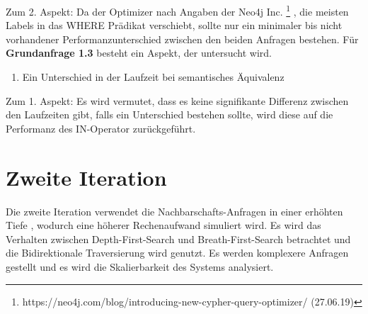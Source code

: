 Zum 2. Aspekt: Da der Optimizer nach Angaben der Neo4j Inc. \footnote{https://neo4j.com/blog/introducing-new-cypher-query-optimizer/ (27.06.19)} , die meisten Labels in das WHERE Prädikat verschiebt, sollte nur ein minimaler bis nicht vorhandener Performanzunterschied zwischen den beiden Anfragen bestehen. \newline \newline
Für \textbf{Grundanfrage 1.3} besteht ein Aspekt, der untersucht wird. 
\begin{enumerate}
	\item Ein Unterschied in der Laufzeit bei  semantisches Äquivalenz  
\end{enumerate}
Zum 1. Aspekt: Es wird vermutet, dass es keine signifikante Differenz zwischen den Laufzeiten gibt, falls ein Unterschied bestehen sollte, wird diese auf die Performanz des IN-Operator zurückgeführt.

\section{Zweite Iteration}
Die zweite Iteration verwendet die Nachbarschafts-Anfragen in einer erhöhten Tiefe , wodurch eine höherer Rechenaufwand simuliert wird. Es wird das Verhalten zwischen  Depth-First-Search und  Breath-First-Search betrachtet und die Bidirektionale Traversierung wird genutzt. Es werden komplexere Anfragen gestellt und es wird die Skalierbarkeit des Systems analysiert. 
